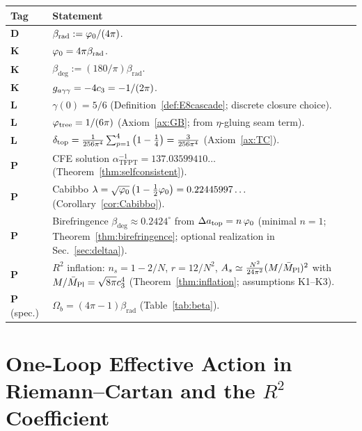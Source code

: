 \begin{center}
\renewcommand{\arraystretch}{1.2}
\begin{tabular}{@{}lp{12cm}@{}}
\toprule
\textbf{Tag} & \textbf{Statement}\\
\midrule
\textbf{D} & $\beta_{\text{rad}} := \varphi_0/(4\pi)$.\\
\textbf{K} & $\varphi_0 = 4\pi\beta_{\text{rad}}$.\\
\textbf{K} & $\beta_{\text{deg}} := (180/\pi)\beta_{\text{rad}}$.\\
\textbf{K} & $g_{a\gamma\gamma} = -4c_3 = -1/(2\pi)$.\\
\textbf{L} & $\gamma(0)=5/6$ (Definition~\ref{def:E8cascade}; discrete closure choice).\\
\textbf{L} & $\varphi_{\mathrm{tree}} = 1/(6\pi)$ (Axiom~\ref{ax:GB}; from $\eta$-gluing seam term).\\
\textbf{L} & $\delta_{\mathrm{top}} = \frac{1}{256\pi^4}\sum_{p=1}^{4}\left(1-\frac{1}{4}\right)=\frac{3}{256\pi^4}$ (Axiom~\ref{ax:TC}).\\
\textbf{P} & CFE solution $\alpha^{-1}_{\text{TFPT}} = 137.03599410\ldots$ (Theorem~\ref{thm:selfconsistent}).\\
\textbf{P} & Cabibbo $\lambda = \sqrt{\varphi_0}\left(1-\frac{1}{2}\varphi_0\right)=0.22445997\ldots$ (Corollary~\ref{cor:Cabibbo}).\\
\textbf{P} & Birefringence $\beta_{\text{deg}} \approx 0.2424^\circ$ from $\Delta a_{\text{top}} = n\,\varphi_0$ (minimal $n=1$; Theorem~\ref{thm:birefringence}; optional realization in Sec.~\ref{sec:deltaa}).\\
\textbf{P} & $R^2$ inflation: $n_s=1-2/N$, $r=12/N^2$, $A_s \simeq \frac{N^2}{24\pi^2}(M/\bar{M}_{\mathrm{Pl}})^2$ with $M/\bar{M}_{\mathrm{Pl}}=\sqrt{8\pi}c_3^4$ (Theorem~\ref{thm:inflation}; assumptions K1--K3).\\
\textbf{P} (spec.) & $\Omega_b = (4\pi-1)\beta_{\text{rad}}$ (Table~\ref{tab:beta}).\\
\bottomrule
\end{tabular}
\end{center}

\section{One-Loop Effective Action in Riemann--Cartan and the $R^2$ Coefficient}
\label{app:r2}

